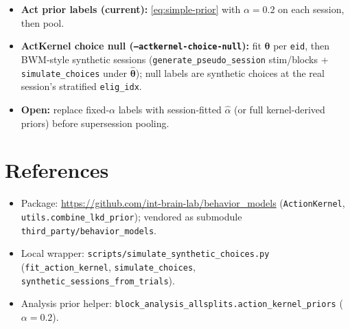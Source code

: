 \documentclass[11pt]{article}
\begin{document}
\begin{itemize}
\item \textbf{Act prior labels (current):}
  \eqref{eq:simple-prior} with \(\alpha=0.2\) on each session, then pool.
\item \textbf{ActKernel choice null (\texttt{--actkernel-choice-null}):}
  fit \(\bm\theta\) per \texttt{eid}, then BWM-style synthetic sessions
  (\texttt{generate\_pseudo\_session} stim/blocks + \texttt{simulate\_choices}
  under \(\hat{\bm\theta}\)); null labels are synthetic choices at the real
  session's stratified \texttt{elig\_idx}.
\item \textbf{Open:} replace fixed-\(\alpha\) labels with
  session-fitted \(\hat\alpha\) (or full kernel-derived priors) before
  supersession pooling.
\end{itemize}

\section*{References}

\begin{itemize}
\item Package:
  \url{https://github.com/int-brain-lab/behavior_models}
  (\texttt{ActionKernel}, \texttt{utils.combine\_lkd\_prior});
  vendored as submodule \texttt{third\_party/behavior\_models}.
\item Local wrapper:
  \texttt{scripts/simulate\_synthetic\_choices.py}
  (\texttt{fit\_action\_kernel}, \texttt{simulate\_choices},
  \texttt{synthetic\_sessions\_from\_trials}).
\item Analysis prior helper:
  \texttt{block\_analysis\_allsplits.action\_kernel\_priors}
  (\(\alpha=0.2\)).
\end{itemize}
\end{document}
